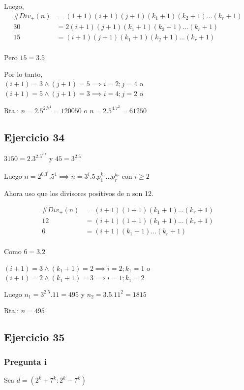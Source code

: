 Luego,
\begin{align*}
    \#Div_+(n) &= (1+1)(i+1)(j+1)(k_1+1)(k_2+1)...(k_r + 1) \\
    30 &= 2(i+1)(j+1)(k_1+1)(k_2+1)...(k_r + 1) \\
    15 &= (i+1)(j+1)(k_1+1)(k_2+1)...(k_r + 1) \\
\end{align*}

Pero $ 15 = 3.5 $

Por lo tanto, \\ 
$ (i+1) = 3 \wedge (j+1) = 5 \implies i = 2; j = 4 $ o \\
$ (i+1) = 5 \wedge (j+1) = 3 \implies i = 4; j = 2 $ o

Rta.: $ n = 2.5^2.7^4 = 120050 $ o $ n = 2.5^4.7^2 = 61250 $

\subsection{Ejercicio 34}
$ 3150 = 2.3^2.5^2.7 $ y $ 45=3^2.5 $

Luego $ n = 2^0.3^i.5^1 \implies n = 3^i.5.p_1^{k_1}...p_r^{k_r} $ con $ i\geq 2$

Ahora uso que los divisores positivos de n son 12.

\begin{align*}
    \#Div_+(n) &= (i+1)(1+1)(k_1+1)...(k_r+1) \\
    12 &= (i+1)(1+1)(k_1+1)...(k_r+1) \\
    6 &= (i+1)(k_1+1)...(k_r+1) \\
\end{align*}

Como $ 6 = 3.2 $

$ (i+1) = 3 \wedge (k_1 + 1) = 2 \implies i = 2; k_1 = 1$ o \\
$ (i+1) = 2 \wedge (k_1 + 1) = 3 \implies i = 1; k_1 = 2$

Luego $ n_1 = 3^2.5.11 = 495 $ y $ n_2 = 3.5.11^2 = 1815 $

Rta.: $ n = 495 $

\subsection{Ejercicio 35}
\subsubsection{Pregunta i}

Sea $ d = (2^k+7^k:2^k-7^k) $

